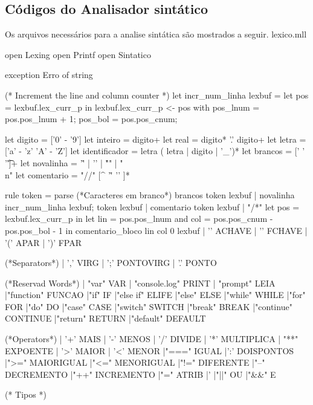 \documentclass[12pt,a4paper,twoside]{article}
\begin{document}
\subsection{Códigos do Analisador sintático}
Os arquivos necessários para a analise sintática são mostrados a seguir.
\newline\newline
lexico.mll
\begin{terminal}
{
	open Lexing
	open Printf
	open Sintatico

	exception Erro of string
	
(* Increment the line and column counter *)
	let incr_num_linha lexbuf =
		let pos = lexbuf.lex_curr_p in
		lexbuf.lex_curr_p <- { pos with
			pos_lnum = pos.pos_lnum + 1;
			pos_bol = pos.pos_cnum;
		}
}

let digito = ['0' - '9']
let inteiro = digito+
let real = digito* '.' digito+
let letra = ['a' - 'z' 'A' - 'Z']
let identificador = letra ( letra | digito | '_')*
let brancos = [' ' '\t']+
let novalinha = '\r' | '\n' | "\r\n" | "\\n"
let comentario = "//" [^ '\r' '\n' ]*


rule token = parse
	(*Caracteres em branco*)
	brancos { token lexbuf }
	| novalinha { incr_num_linha lexbuf; token lexbuf }
	| comentario { token lexbuf }
	| "/*"			{	let pos = lexbuf.lex_curr_p in
						let lin = pos.pos_lnum
						and col = pos.pos_cnum - pos.pos_bol - 1 in
						comentario_bloco lin col 0 lexbuf 
					}
	| '{'			{ACHAVE}
	| '}'			{FCHAVE}
	| '('			{ APAR }
	| ')'			{ FPAR }

	(*Separators*)
	| ','			{ VIRG }
	| ';'			{ PONTOVIRG }
	| '.'			{ PONTO }

	(*Reservad Words*)
	| "var"			{ VAR }
	| "console.log" 	{ PRINT }
	| "prompt"	{ LEIA }
	|"function" { FUNCAO }
	|"if"				{ IF }
	|"else if" 	{ ELIFE }
	|"else"			{ ELSE }
	|"while"		{ WHILE }
	|"for"			{ FOR }
	|"do"				{ DO }
	|"case"			{ CASE }
	|"switch"		{ SWITCH }
	|"break"		{ BREAK }
	|"continue"	{ CONTINUE }
	|"return"		{ RETURN}
	|"default"		{ DEFAULT}


	(*Operators*)
	| '+'			{ MAIS }
	| '-'			{ MENOS }
	| '/'			{ DIVIDE }
	| '*'			{ MULTIPLICA }
	| "**"		{ EXPOENTE }
	| '>'			{ MAIOR }
	| '<'			{ MENOR }
	|"==="			{ IGUAL }
	|':'			{ DOISPONTOS }
	|">="			{ MAIORIGUAL }
	|"<="			{ MENORIGUAL }
	|"!="			{ DIFERENTE }
	|"--"			{ DECREMENTO }	
	|"++"			{ INCREMENTO }	
	|"="			{ ATRIB }
	|'%
	|"||"			{ OU }
	|"&&"			{ E }

	(* Tipos *)


\end{terminal}
\end{document}
